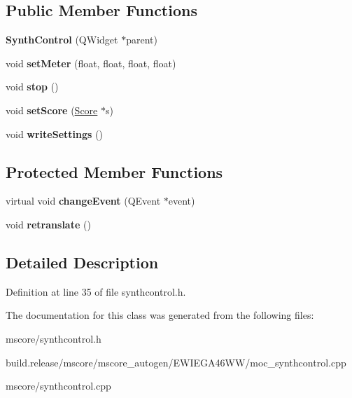 \subsection*{Public Member Functions}
\begin{DoxyCompactItemize}
\item 
\mbox{\label{class_ms_1_1_synth_control_af3b5d1cd9493e5396c88deb736add4bb}} 
{\bfseries Synth\+Control} (Q\+Widget $\ast$parent)
\item 
\mbox{\label{class_ms_1_1_synth_control_aef05defaf5a3fa71dd99bc245128b9b7}} 
void {\bfseries set\+Meter} (float, float, float, float)
\item 
\mbox{\label{class_ms_1_1_synth_control_a3e1a837022f45cafca8a4027abbef397}} 
void {\bfseries stop} ()
\item 
\mbox{\label{class_ms_1_1_synth_control_ab5e3f7ed35a4c5dcd4d67695a87fae4b}} 
void {\bfseries set\+Score} (\hyperlink{class_ms_1_1_score}{Score} $\ast$s)
\item 
\mbox{\label{class_ms_1_1_synth_control_a4436d2b0b44b4e29813c974c48d9be1f}} 
void {\bfseries write\+Settings} ()
\end{DoxyCompactItemize}
\subsection*{Protected Member Functions}
\begin{DoxyCompactItemize}
\item 
\mbox{\label{class_ms_1_1_synth_control_a7dca8767d064e90effccaa4cd528cbf6}} 
virtual void {\bfseries change\+Event} (Q\+Event $\ast$event)
\item 
\mbox{\label{class_ms_1_1_synth_control_a1e9485e098b26666b56326b3a2246f6d}} 
void {\bfseries retranslate} ()
\end{DoxyCompactItemize}


\subsection{Detailed Description}


Definition at line 35 of file synthcontrol.\+h.



The documentation for this class was generated from the following files\+:\begin{DoxyCompactItemize}
\item 
mscore/synthcontrol.\+h\item 
build.\+release/mscore/mscore\+\_\+autogen/\+E\+W\+I\+E\+G\+A46\+W\+W/moc\+\_\+synthcontrol.\+cpp\item 
mscore/synthcontrol.\+cpp\end{DoxyCompactItemize}
